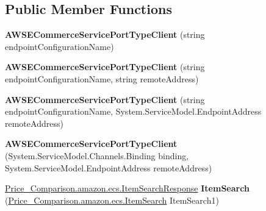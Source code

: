 \subsection*{Public Member Functions}
\begin{DoxyCompactItemize}
\item 
\hypertarget{class_price___comparison_1_1amazon_1_1ecs_1_1_a_w_s_e_commerce_service_port_type_client_ac0b53c68d940fb55159dd804ac614ff4}{{\bfseries A\-W\-S\-E\-Commerce\-Service\-Port\-Type\-Client} (string endpoint\-Configuration\-Name)}\label{class_price___comparison_1_1amazon_1_1ecs_1_1_a_w_s_e_commerce_service_port_type_client_ac0b53c68d940fb55159dd804ac614ff4}

\item 
\hypertarget{class_price___comparison_1_1amazon_1_1ecs_1_1_a_w_s_e_commerce_service_port_type_client_a4a648013e55c2308e5c295eb8c3601fe}{{\bfseries A\-W\-S\-E\-Commerce\-Service\-Port\-Type\-Client} (string endpoint\-Configuration\-Name, string remote\-Address)}\label{class_price___comparison_1_1amazon_1_1ecs_1_1_a_w_s_e_commerce_service_port_type_client_a4a648013e55c2308e5c295eb8c3601fe}

\item 
\hypertarget{class_price___comparison_1_1amazon_1_1ecs_1_1_a_w_s_e_commerce_service_port_type_client_a4a664781e3d05c48864860f54c8b2334}{{\bfseries A\-W\-S\-E\-Commerce\-Service\-Port\-Type\-Client} (string endpoint\-Configuration\-Name, System.\-Service\-Model.\-Endpoint\-Address remote\-Address)}\label{class_price___comparison_1_1amazon_1_1ecs_1_1_a_w_s_e_commerce_service_port_type_client_a4a664781e3d05c48864860f54c8b2334}

\item 
\hypertarget{class_price___comparison_1_1amazon_1_1ecs_1_1_a_w_s_e_commerce_service_port_type_client_a40a049ed2a419f68590a0edfd8ec03dd}{{\bfseries A\-W\-S\-E\-Commerce\-Service\-Port\-Type\-Client} (System.\-Service\-Model.\-Channels.\-Binding binding, System.\-Service\-Model.\-Endpoint\-Address remote\-Address)}\label{class_price___comparison_1_1amazon_1_1ecs_1_1_a_w_s_e_commerce_service_port_type_client_a40a049ed2a419f68590a0edfd8ec03dd}

\item 
\hypertarget{class_price___comparison_1_1amazon_1_1ecs_1_1_a_w_s_e_commerce_service_port_type_client_ab71bf9bd27eea24da85af6b6e3d03eba}{\hyperlink{class_price___comparison_1_1amazon_1_1ecs_1_1_item_search_response}{Price\-\_\-\-Comparison.\-amazon.\-ecs.\-Item\-Search\-Response} {\bfseries Item\-Search} (\hyperlink{class_price___comparison_1_1amazon_1_1ecs_1_1_item_search}{Price\-\_\-\-Comparison.\-amazon.\-ecs.\-Item\-Search} Item\-Search1)}\label{class_price___comparison_1_1amazon_1_1ecs_1_1_a_w_s_e_commerce_service_port_type_client_ab71bf9bd27eea24da85af6b6e3d03eba}


\end{DoxyCompactItemize}
